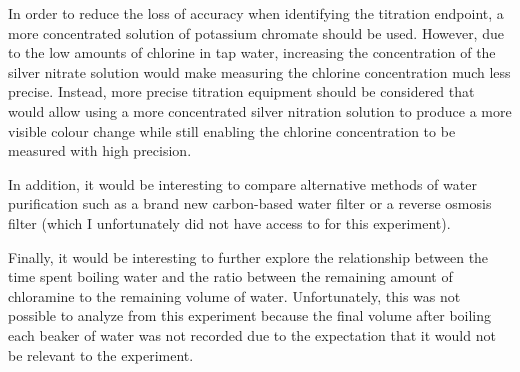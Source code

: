 \documentclass[11pt]{article}
\begin{document}
In order to reduce the loss of accuracy when identifying the titration endpoint, a more concentrated solution of potassium chromate should be used. However, due to the low amounts of chlorine in tap water, increasing the concentration of the silver nitrate solution would make measuring the chlorine concentration much less precise. Instead, more precise titration equipment should be considered that would allow using a more concentrated silver nitration solution to produce a more visible colour change while still enabling the chlorine concentration to be measured with high precision.

In addition, it would be interesting to compare alternative methods of water purification such as a brand new carbon-based water filter or a reverse osmosis filter (which I unfortunately did not have access to for this experiment).

Finally, it would be interesting to further explore the relationship between the time spent boiling water and the ratio between the remaining amount of chloramine to the remaining volume of water. Unfortunately, this was not possible to analyze from this experiment because the final volume after boiling each beaker of water was not recorded due to the expectation that it would not be relevant to the experiment.

\newpage

\nocite{*}
\setlength{}
\printbibliography
\end{document}
